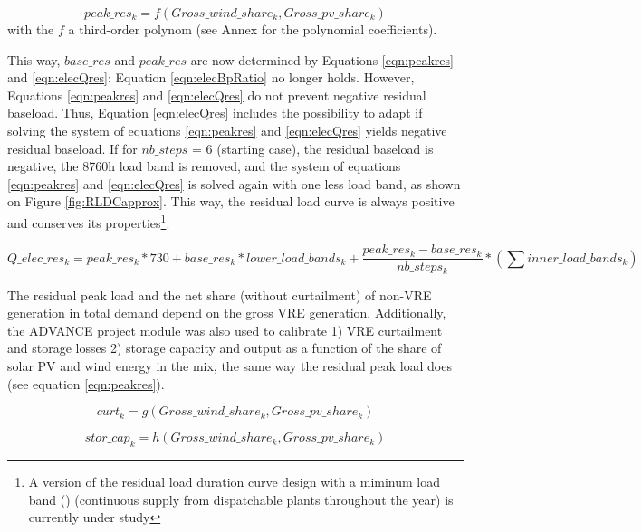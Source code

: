 \begin{dmath}
    {peak\_res_{k}} = f(Gross\_wind\_share_{k},Gross\_pv\_share_{k})
    \label{eqn:peakres}
\end{dmath}
with the $f$ a third-order polynom (see Annex for the polynomial coefficients).


This way, $base\_res$ and $peak\_res$ are now determined by Equations \ref{eqn:peakres} and \ref{eqn:elecQres}: Equation \ref{eqn:elecBpRatio} no longer holds. However, Equations \ref{eqn:peakres} and \ref{eqn:elecQres} do not prevent negative residual baseload. Thus, Equation \ref{eqn:elecQres} includes the possibility to adapt if solving the system of equations \ref{eqn:peakres} and \ref{eqn:elecQres} yields negative residual baseload. If for  $nb\_steps$ = 6 (starting case), the residual baseload is negative, the 8760h load band is removed, and the system of equations \ref{eqn:peakres} and \ref{eqn:elecQres} is solved again with one less load band, as shown on Figure \ref{fig:RLDCapprox}. This way, the residual load curve is always positive and conserves its properties\footnote{A version of the residual load duration curve design with a miminum load band (\cite{Ueckerdt2015}) (continuous supply from dispatchable plants throughout the year) is currently under study}.


\begin{dmath}
    Q\_elec\_res_k =
    {peak\_res_k} * 730 +
    {base\_res_k} * {lower\_load\_bands_k} +
    \frac{peak\_res_k - base\_res_k}{nb\_steps_k} * ( \sum inner\_load\_bands_k)
    \label{eqn:elecQres}
\end{dmath}


The residual peak load and the net share (without curtailment) of non-VRE generation in total demand depend on the gross VRE generation. Additionally, the ADVANCE project module was also used to calibrate 1) VRE curtailment and storage losses 2) storage capacity and output as a function of the share of solar PV and wind energy in the mix, the same way the residual peak load does (see equation \ref{eqn:peakres}).

\begin{dmath}
    {curt_{k}} = g(Gross\_wind\_share_{k},Gross\_pv\_share_{k})
    \label{eqn:curt}
\end{dmath}

\begin{dmath}
    {stor\_cap_{k}} = h(Gross\_wind\_share_{k},Gross\_pv\_share_{k})
    \label{eqn:stor_cap}
\end{dmath}

